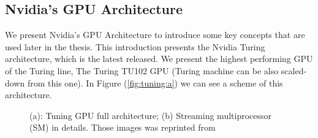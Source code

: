 \subsection{Nvidia's GPU Architecture}
We present Nvidia's GPU Architecture to introduce some key concepts that are used later in the thesis. This introduction presents the Nvidia Turing architecture, which is the latest released. We present the highest performing GPU of the Turing line, The Turing TU102 GPU (Turing machine can be also scaled-down from this one). 
In Figure (\ref{fig:tuning:a}) we can see a scheme of this architecture.
\begin{figure}[h]\label{fig:tuning}
	\hspace*{-4em}
	\hspace{4em}%
	\caption{(a): Tuning GPU full architecture; (b) Streaming multiprocessor (SM) in details. Those images was reprinted from \cite{turing} }
\end{figure}
